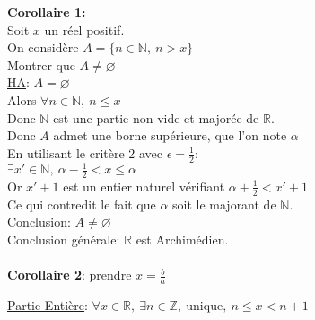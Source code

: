 \documentclass[12pt,twoside,a4paper]{article}
\begin{document}
			\begin{preuve}
				\textbf{Corollaire 1:}\\
				Soit $x$ un r\'eel positif.\\
				On consid\`ere $A=\{n\in\mathbb{N},\ n>x\}$\\
				Montrer que $A\neq\varnothing$\\
				\underline{HA}: $A=\varnothing$\\
				Alors $\forall n\in\mathbb{N},\ n\leqslant x$\\
				Donc $\mathbb{N}$ est une partie non vide et major\'ee de $\mathbb{R}$.\\
				Donc $A$ admet une borne sup\'erieure, que l'on note $\alpha$\\
				En utilisant le critère 2 avec $\epsilon=\frac{1}{2}$:\\
				$\exists x'\in\mathbb{N},\ \alpha-\frac{1}{2}<x\leqslant\alpha$\\
				Or $x'+1$ est un entier naturel v\'erifiant $\alpha+\frac{1}{2}<x'+1$\\
				Ce qui contredit le fait que $\alpha$ soit le majorant de $\mathbb{N}$.\\
				Conclusion: $A\neq\varnothing$\\
				Conclusion g\'en\'erale: $\mathbb{R}$ est Archim\'edien.\\
				\\
				\textbf{Corollaire 2}: prendre $x=\frac{b}{a}$
			\end{preuve}
			\begin{coro}
				\underline{Partie Entière}: $\forall x\in\mathbb{R},\ \exists n\in\mathbb{Z},\ \text{unique},\ n\leqslant x<n+1$
			\end{coro}
\end{document}
